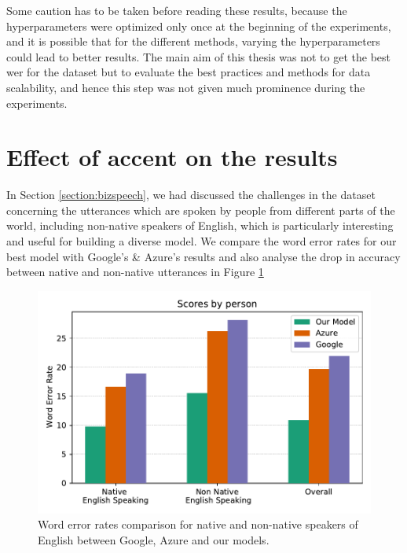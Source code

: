 Some caution has to be taken before reading these results, because the hyperparameters were optimized only once at the beginning of the experiments, and it is possible that for the different methods, varying the hyperparameters could lead to better results. The main aim of this thesis was not to get the best \acrshort{wer} for the dataset but to evaluate the best practices and methods for data scalability, and hence this step was not given much prominence during the experiments. 

\section{Effect of accent on the results}
\label{section:accentwer}
In Section \ref{section:bizspeech}, we had discussed the challenges in the dataset concerning the utterances which are spoken by people from different parts of the world, including non-native speakers of English, which is particularly interesting and useful for building a diverse model. We compare the word error rates for our best model with Google's \& Azure's results and also analyse the drop in accuracy between native and non-native utterances in Figure \ref{fig:wer_cloud_final} 

\begin{figure}[ht]
  \begin{center}
    \includegraphics[width=\textwidth]{images/wer_cloud_final.pdf} 
    \caption{Word error rates comparison for native and non-native speakers of English between Google, Azure and our models.}
    \label{fig:wer_cloud_final}
  \end{center}
\end{figure}

